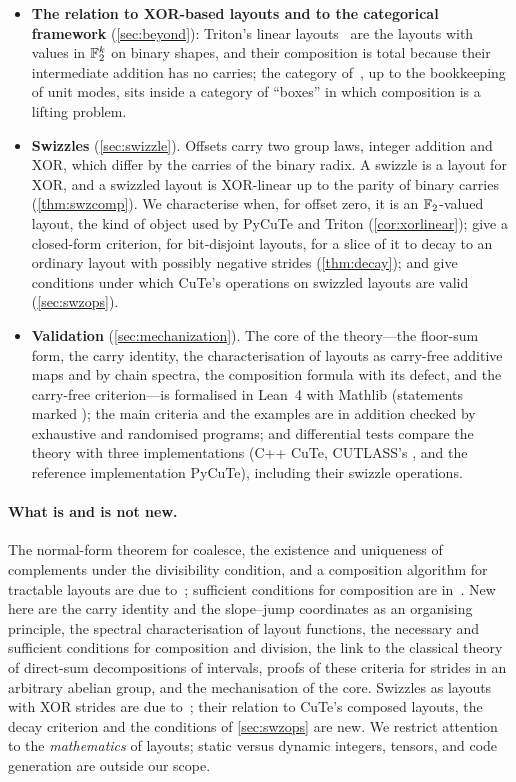 \begin{itemize}[leftmargin=1.4em,itemsep=2pt]
 for ---we give a criterion that is exact for an arbitrary outer layout
 (\cref{thm:division}).
\item \textbf{The relation to XOR-based layouts and to the categorical framework}
 (\cref{sec:beyond}): Triton's linear layouts~\cite{zhou2026} are the layouts with values in
 $\mathbb{F}_2^k$ on binary shapes, and their composition is total because their intermediate addition
 has no carries; the category of~\cite{carlisle2026}, up to the bookkeeping of unit modes, sits
 inside a category of ``boxes'' in which
 composition is a lifting problem.
\item \textbf{Swizzles} (\cref{sec:swizzle}). Offsets carry two group laws, integer addition and
 XOR, which differ by the carries of the binary radix. A swizzle is a layout for XOR, and a
 swizzled layout is XOR-linear up to the parity of binary carries (\cref{thm:swzcomp}). We
 characterise when, for offset zero, it is an $\mathbb{F}_2$-valued layout, the kind of object used by
 PyCuTe and Triton
 (\cref{cor:xorlinear}); give a closed-form criterion, for bit-disjoint layouts, for a slice of
 it to decay to an ordinary layout with possibly negative strides (\cref{thm:decay}); and give
 conditions under which CuTe's operations on swizzled layouts are valid (\cref{sec:swzops}).
\item \textbf{Validation} (\cref{sec:mechanization}). The core of the theory---the floor-sum form,
 the carry identity, the characterisation of layouts as carry-free additive maps and by chain
 spectra, the composition formula with its defect, and the carry-free criterion---is formalised in Lean~4 with Mathlib
 (statements marked \mech); the main criteria and the examples are in addition checked by
 exhaustive and randomised programs; and differential tests compare the theory with three implementations (C++
 CuTe, CUTLASS's , and the reference implementation PyCuTe), including their
 swizzle operations.
\end{itemize}

\paragraph{What is and is not new.} The normal-form theorem for coalesce, the existence and
uniqueness of complements under the divisibility condition, and a composition algorithm for
tractable layouts are due to~\cite{shah2024,carlisle2026}; sufficient conditions for composition
are in~\cite{shah2024,cecka2026}. New here are the carry identity and the slope--jump
coordinates as an organising principle, the spectral characterisation of layout functions, the
necessary and sufficient conditions for composition and division, the link to the classical
theory of direct-sum decompositions of intervals, proofs of these criteria for strides in an
arbitrary abelian group, and the mechanisation of the core.
Swizzles as layouts with XOR strides are due to~\cite{cecka2026}; their relation to CuTe's composed
layouts, the decay criterion and the conditions of \cref{sec:swzops} are new. We restrict
attention to the \emph{mathematics} of layouts; static versus dynamic integers, tensors, and code
generation are outside our scope.
